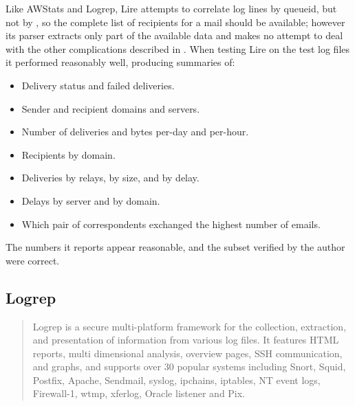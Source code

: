 Like AWStats and Logrep, Lire attempts to correlate log lines by queueid,
but not by \pid{}, so the complete list of recipients for a mail should be
available; however its parser extracts only part of the available data and
makes no attempt to deal with the other complications described in
.  When testing Lire on the \numberOFlogFILES{}
test log files it performed reasonably well, producing summaries of: 

\begin{itemize}

    \item Delivery status and failed deliveries.

    \item Sender and recipient domains and servers.

    \item Number of deliveries and bytes per-day and per-hour.

    \item Recipients by domain.

    \item Deliveries by relays, by size, and by delay.

    \item Delays by server and by domain.

    \item Which pair of correspondents exchanged the highest number of
        emails.

\end{itemize}

The numbers it reports appear reasonable, and the subset verified by the
author were correct.  

\subsection{Logrep}

\begin{quotation}

    Logrep is a secure multi-platform framework for the collection,
    extraction, and presentation of information from various log files. It
    features HTML reports, multi dimensional analysis, overview pages, SSH
    communication, and graphs, and supports over 30 popular systems
    including Snort, Squid, Postfix, Apache, Sendmail, syslog, ipchains,
    iptables, NT event logs, Firewall-1, wtmp, xferlog, Oracle listener and
    Pix.

\end{quotation}

